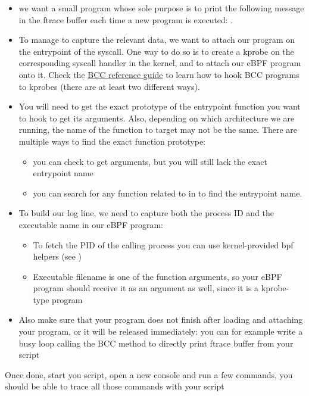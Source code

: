 \begin{itemize}
  \item we want a small program whose sole purpose is to print the following message in the ftrace buffer each time a new program is executed: .
  \item To manage to capture the relevant data, we want to attach our program
  on the entrypoint of the  syscall. One way to do so is to create
  a kprobe on the corresponding syscall handler in the kernel, and to attach
  our eBPF program onto it. Check the
  \href{https://github.com/iovisor/bcc/blob/master/docs/reference_guide.md}{BCC
  reference guide} to learn how to hook BCC programs to kprobes (there are at
  least two different ways).
  \item You will need to get the exact prototype of the 
  entrypoint function you want to hook to get its arguments. Also, depending on
  which architecture we are running, the name of the function to target may not
  be the same. There are multiple ways to find the exact function prototype:
  \begin{itemize}
    \item you can check  to get  arguments, but
    you will still lack the exact entrypoint name
    \item you can search for any function related to  in
     to find the
    entrypoint name.
  \end{itemize}
  \item To build our log line, we need to capture both the process ID and the
  executable name in our eBPF program:
  \begin{itemize}
    \item To fetch the PID of the calling process you can use kernel-provided bpf helpers (see )
    \item Executable filename is one of the  function arguments, so your eBPF program should receive it as an argument as well, since it is a kprobe-type program
  \end{itemize}
  \item Also make sure that your program does not finish after loading and attaching your program, or it will be released immediately: you can for example write a busy loop calling the BCC method  to directly print ftrace buffer from your script
\end{itemize}
Once done, start you script, open a new console and run a few commands, you should be able to trace all those commands with your script

